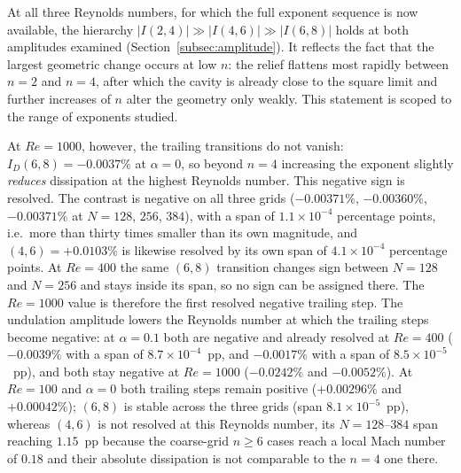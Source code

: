 At all three Reynolds numbers, for which the full exponent sequence is now available, the hierarchy $|I(2,4)|\gg|I(4,6)|\gg|I(6,8)|$ holds at both amplitudes examined (Section~\ref{subsec:amplitude}). It reflects the fact that the largest geometric change occurs at low $n$: the relief flattens most rapidly between $n=2$ and $n=4$, after which the cavity is already close to the square limit and further increases of $n$ alter the geometry only weakly. This statement is scoped to the range of exponents studied.

At $Re=1000$, however, the trailing transitions do not vanish: $I_D(6,8)=-0.0037\%$ at $\alpha=0$, so beyond $n=4$ increasing the exponent slightly \emph{reduces} dissipation at the highest Reynolds number. This negative sign is resolved. The contrast is negative on all three grids ($-0.00371\%$, $-0.00360\%$, $-0.00371\%$ at $N=128$, $256$, $384$), with a span of $1.1\times10^{-4}$ percentage points, i.e.\ more than thirty times smaller than its own magnitude, and $(4,6)=+0.0103\%$ is likewise resolved by its own span of $4.1\times10^{-4}$ percentage points. At $Re=400$ the same $(6,8)$ transition changes sign between $N=128$ and $N=256$ and stays inside its span, so no sign can be assigned there. The $Re=1000$ value is therefore the first resolved negative trailing step. The undulation amplitude lowers the Reynolds number at which the trailing steps become negative: at $\alpha=0.1$ both are negative and already resolved at $Re=400$ ($-0.0039\%$ with a span of $8.7\times10^{-4}$~pp, and $-0.0017\%$ with a span of $8.5\times10^{-5}$~pp), and both stay negative at $Re=1000$ ($-0.0242\%$ and $-0.0052\%$). At $Re=100$ and $\alpha=0$ both trailing steps remain positive ($+0.00296\%$ and $+0.00042\%$); $(6,8)$ is stable across the three grids (span $8.1\times10^{-5}$~pp), whereas $(4,6)$ is not resolved at this Reynolds number, its $N=128$--$384$ span reaching $1.15$~pp because the coarse-grid $n\ge6$ cases reach a local Mach number of $0.18$ and their absolute dissipation is not comparable to the $n=4$ one there.

